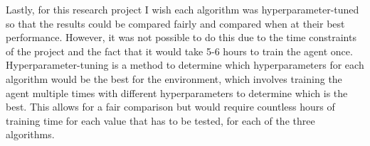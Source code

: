Lastly, for this research project I wish each algorithm was hyperparameter-tuned so that the results could be compared fairly and compared when at their best performance. However, it was not possible to do this due to the time constraints of the project and the fact that it would take 5-6 hours to train the agent once. Hyperparameter-tuning is a method to determine which hyperparameters for each algorithm would be the best for the environment, which involves training the agent multiple times with different hyperparameters to determine which is the best. This allows for a fair comparison but would require countless hours of training time for each value that has to be tested, for each of the three algorithms. 